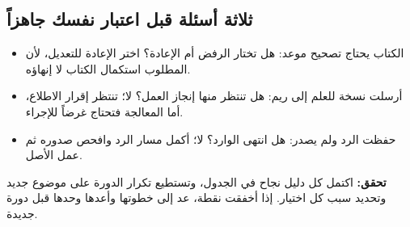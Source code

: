 \subsection{ثلاثة أسئلة قبل اعتبار نفسك جاهزاً}
\begin{itemize}
\item الكتاب يحتاج تصحيح موعد: هل تختار الرفض أم الإعادة؟ اختر الإعادة للتعديل، لأن المطلوب استكمال الكتاب لا إنهاؤه.
\item أرسلت نسخة للعلم إلى ريم: هل تنتظر منها إنجاز العمل؟ لا؛ تنتظر إقرار الاطلاع، أما المعالجة فتحتاج غرضاً للإجراء.
\item حفظت الرد ولم يصدر: هل انتهى الوارد؟ لا؛ أكمل مسار الرد وافحص صدوره ثم عمل الأصل.
\end{itemize}
\textbf{تحقق:} اكتمل كل دليل نجاح في الجدول، وتستطيع تكرار الدورة على موضوع جديد وتحديد سبب كل اختيار. إذا أخفقت نقطة، عد إلى خطوتها وأعدها وحدها قبل دورة جديدة.
